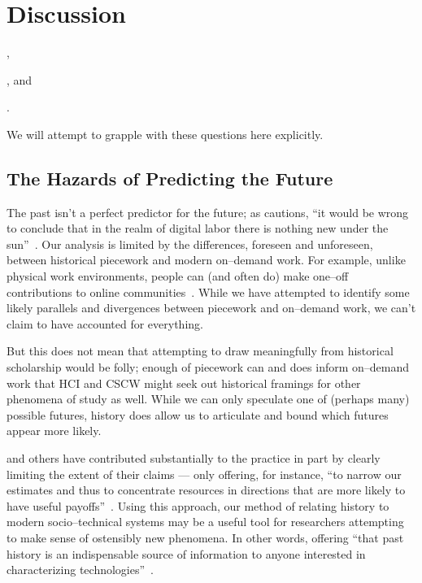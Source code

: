 \documentclass[trackingWork]{subfiles}
\begin{document}
\section{Discussion}
\begin{inlinelist}
  \item {},
  \item {}, and
  \item {}.
\end{inlinelist}
We will attempt to grapple with these questions here explicitly.


\subsection{The Hazards of Predicting the Future}\label{sec:perilousProblemsPredicting}
The past isn't a perfect predictor for the future;
as \citeauthor{scholz2012digital} cautions,
``it would be wrong to conclude that in the realm of digital labor there is nothing new under the sun''~\cite{scholz2012digital}.
Our analysis is limited by the differences, foreseen and unforeseen, between historical piecework and modern on--demand work.
For example, unlike physical work environments, people can (and often do) make one--off contributions to online communities~\cite{mcinnis2016one}.
While we have attempted to identify some likely parallels and divergences between piecework and on--demand work,
we can't claim to have accounted for everything.

But this does not mean that attempting to draw meaningfully from historical scholarship would be folly;
enough of piecework can and does inform on--demand work that
HCI and CSCW might seek out historical framings for other phenomena of study as well.
While we can only speculate one of (perhaps many) possible futures, history does allow us to articulate and bound which futures appear more likely.

\citeauthor{rosenberg1994exploring} and others have contributed substantially to the practice in part by clearly limiting the extent of their claims
--- only offering, for instance,
``to narrow our estimates and thus to concentrate resources in directions that are more likely to have useful payoffs''~\cite{rosenberg1994exploring}.
Using this approach,
our method of relating history to modern socio--technical systems may be
a useful tool for researchers attempting
to make sense of ostensibly new phenomena.
In other words, offering ``that past history is an indispensable source of information
to anyone interested in characterizing technologies''~\cite{rosenberg1982inside}.
\end{document}
